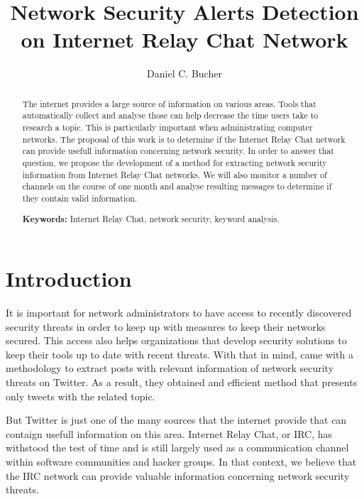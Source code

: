 \documentclass[12pt]{article}
\begin{document}
\sloppy

\title{Network Security Alerts Detection on Internet Relay Chat Network}

\author {Daniel C. Bucher}


\address{Instituto de Matemática e Estatística -- Universidade de São Paulo (USP)\\
  Rua do Matão, 1010 - CEP 05508-090 - São Paulo - SP
}


\maketitle
\begin{abstract}
  The internet provides a large source of information on various areas. Tools
  that automatically collect and analyse those can help decrease the time
  users take to research a topic.
  This is particularly important when administrating computer networks.
  The proposal of this work is to determine if the Internet Relay Chat network
  can provide usefull information concerning network security.
  In order to answer that question, we propose the development of a method for
  extracting network security information from Internet Relay Chat networks.
  We will also monitor a number of channels on the course of one month and analyse
  resulting messages to determine if they contain valid information.

\textbf{Keywords:} Internet Relay Chat, network security, keyword analysis.

\end{abstract}


\section{Introduction} \label{sec:intro}

It is important for network administrators to have access to recently
discovered security threats in order to keep up with measures to keep their
networks secured. This access also helps organizations that develop security
solutions to keep their tools up to date with recent threats.
%
With that in mind, \cite{campiolo2013} came with a methodology to extract
posts with relevant information of network security threats on Twitter.
As a result, they obtained and efficient method that presents only tweets
with the related topic.

But Twitter is just one of the many sources that the internet provide that
can contaign usefull information on this area.
%
Internet Relay Chat, or IRC, has withstood the test of time and is still
largely used as a communication channel within software communities and
hacker groups.
%
In that context, we believe that the IRC network can provide valuable
information concerning network security threats.
\end{document}
